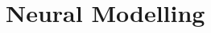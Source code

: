 \documentclass[b5paper,12 pt]{report}
\begin{document}

	
	
% 	




\chapter{Neural Modelling}
	\label{chapDevelopmentOfANovelModel}
\end{document}
